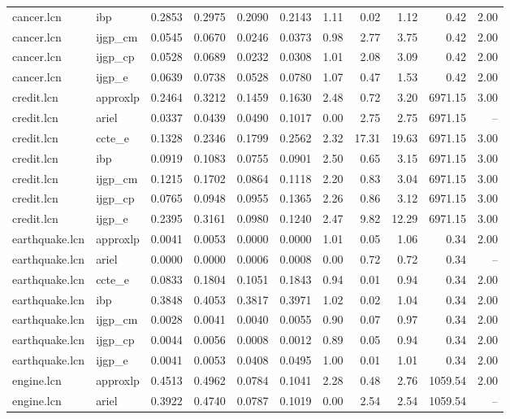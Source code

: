 \begin{table}[ht]
\begin{tabular}{llrrrrrrrrr}
cancer.lcn & ibp & 0.2853 & 0.2975 & 0.2090 & 0.2143 & 1.11 & 0.02 & 1.12 & 0.42 & 2.00 \\
cancer.lcn & ijgp_cm & 0.0545 & 0.0670 & 0.0246 & 0.0373 & 0.98 & 2.77 & 3.75 & 0.42 & 2.00 \\
cancer.lcn & ijgp_cp & 0.0528 & 0.0689 & 0.0232 & 0.0308 & 1.01 & 2.08 & 3.09 & 0.42 & 2.00 \\
cancer.lcn & ijgp_e & 0.0639 & 0.0738 & 0.0528 & 0.0780 & 1.07 & 0.47 & 1.53 & 0.42 & 2.00 \\
credit.lcn & approxlp & 0.2464 & 0.3212 & 0.1459 & 0.1630 & 2.48 & 0.72 & 3.20 & 6971.15 & 3.00 \\
credit.lcn & ariel & 0.0337 & 0.0439 & 0.0490 & 0.1017 & 0.00 & 2.75 & 2.75 & 6971.15 & -- \\
credit.lcn & ccte_e & 0.1328 & 0.2346 & 0.1799 & 0.2562 & 2.32 & 17.31 & 19.63 & 6971.15 & 3.00 \\
credit.lcn & ibp & 0.0919 & 0.1083 & 0.0755 & 0.0901 & 2.50 & 0.65 & 3.15 & 6971.15 & 3.00 \\
credit.lcn & ijgp_cm & 0.1215 & 0.1702 & 0.0864 & 0.1118 & 2.20 & 0.83 & 3.04 & 6971.15 & 3.00 \\
credit.lcn & ijgp_cp & 0.0765 & 0.0948 & 0.0955 & 0.1365 & 2.26 & 0.86 & 3.12 & 6971.15 & 3.00 \\
credit.lcn & ijgp_e & 0.2395 & 0.3161 & 0.0980 & 0.1240 & 2.47 & 9.82 & 12.29 & 6971.15 & 3.00 \\
earthquake.lcn & approxlp & 0.0041 & 0.0053 & 0.0000 & 0.0000 & 1.01 & 0.05 & 1.06 & 0.34 & 2.00 \\
earthquake.lcn & ariel & 0.0000 & 0.0000 & 0.0006 & 0.0008 & 0.00 & 0.72 & 0.72 & 0.34 & -- \\
earthquake.lcn & ccte_e & 0.0833 & 0.1804 & 0.1051 & 0.1843 & 0.94 & 0.01 & 0.94 & 0.34 & 2.00 \\
earthquake.lcn & ibp & 0.3848 & 0.4053 & 0.3817 & 0.3971 & 1.02 & 0.02 & 1.04 & 0.34 & 2.00 \\
earthquake.lcn & ijgp_cm & 0.0028 & 0.0041 & 0.0040 & 0.0055 & 0.90 & 0.07 & 0.97 & 0.34 & 2.00 \\
earthquake.lcn & ijgp_cp & 0.0044 & 0.0056 & 0.0008 & 0.0012 & 0.89 & 0.05 & 0.94 & 0.34 & 2.00 \\
earthquake.lcn & ijgp_e & 0.0041 & 0.0053 & 0.0408 & 0.0495 & 1.00 & 0.01 & 1.01 & 0.34 & 2.00 \\
engine.lcn & approxlp & 0.4513 & 0.4962 & 0.0784 & 0.1041 & 2.28 & 0.48 & 2.76 & 1059.54 & 2.00 \\
engine.lcn & ariel & 0.3922 & 0.4740 & 0.0787 & 0.1019 & 0.00 & 2.54 & 2.54 & 1059.54 & -- \\

\end{tabular}
\end{table}
